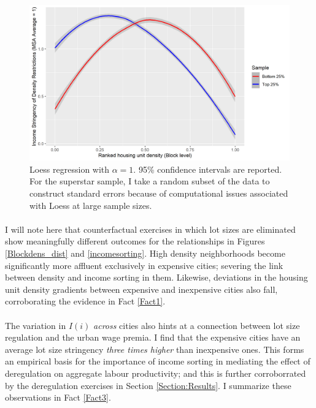 \documentclass[]{article}
\begin{document}
\begin{figure}[htbp]
	\begin{center}
		\includegraphics[width=1.1\textwidth]{stringencyofDensityRestrictions.png}
		\caption{Loess regression with $\alpha = 1$. 95\% confidence intervals are reported. For the superstar sample, I take a random subset of the data to construct standard errors because of computational issues associated with Loess at large sample sizes.}\label{stringencyPatterns}
	\end{center}
\end{figure}


\paragraph*{}
I will note here that counterfactual exercises in which lot sizes are eliminated show meaningfully different outcomes for the relationships in Figures \ref{Blockdens_dist} and \ref{incomesorting}. High density neighborhoods become significantly more affluent exclusively in expensive cities; severing the link between density and income sorting in them. Likewise, deviations in the housing unit density gradients between expensive and inexpensive cities also fall, corroborating the evidence in Fact \ref{Fact1}. 

\paragraph*{}
The variation in $I(i)$ \textit{across} cities also hints at a connection between lot size regulation and the urban wage premia. I find that the expensive cities have an average lot size stringency \textit{three times higher} than inexpensive ones. This forms an empirical basis for the importance of income sorting in mediating the effect of deregulation on aggregate labour productivity; and this is further corroborrated by the deregulation exercises in Section \ref{Section:Results}. I summarize these observations in Fact \ref{Fact3}.
\end{document}
